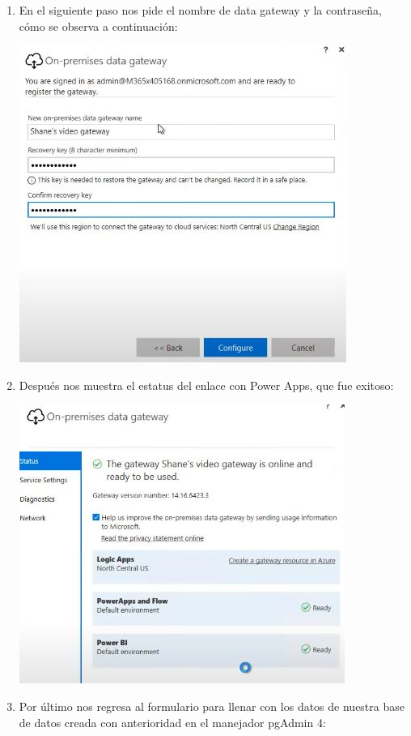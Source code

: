 \documentclass[letter,12pt]{article} %
\begin{document}
\begin{enumerate}
\begin{center}
\end{center}
\item En el siguiente paso nos pide el nombre de data gateway y la contraseña, cómo se observa a continuación:
\begin{center} 
\includegraphics[scale=0.95]{imagenes/P09.jpg}
\end{center} 
\newpage
\item Después nos muestra el estatus del enlace con Power Apps, que fue exitoso:
\begin{center} 
\includegraphics[scale=0.95]{imagenes/P10.jpg}
\end{center}
\item Por último nos regresa al formulario para llenar con los datos de nuestra base de datos creada con anterioridad en el manejador pgAdmin 4:

\end{enumerate}
\end{document}
